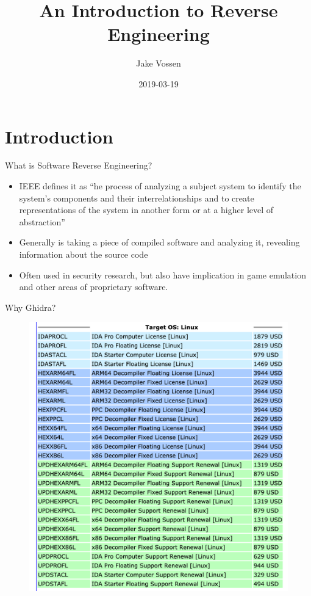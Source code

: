 \documentclass{beamer}
\title[Ghidra]{An Introduction to Reverse Engineering}
\author{Jake Vossen}
\institute{Colorado School of Mines - oresec}
\date{2019-03-19}
\begin{document}
\begin{frame}
  \titlepage
\end{frame}


\section{Introduction}

\begin{frame}{What is Software Reverse Engineering?}

\begin{itemize}
  \item IEEE defines it as ``he process of analyzing a subject system to identify the system's components and their interrelationships and to create representations of the system in another form or at a higher level of abstraction''
  \item Generally is taking a piece of compiled software and analyzing
    it, revealing information about the source code
  \item Often used in security research, but also have implication in
    game emulation and other areas of proprietary software.
\end{itemize}

\vskip 1cm

\end{frame}

\begin{frame}{Why Ghidra?}
  \begin{figure}
    \includegraphics[width=\textwidth]{hex-rays-pricing.png}
  \end{figure}
\end{frame}
\end{document}
